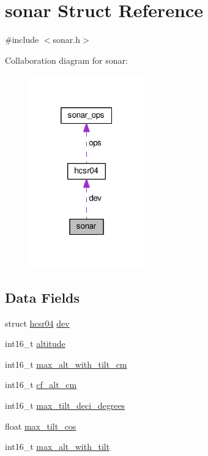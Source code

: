 \hypertarget{structsonar}{\section{sonar Struct Reference}
\label{structsonar}
}


{\ttfamily \#include $<$sonar.\+h$>$}



Collaboration diagram for sonar\+:\nopagebreak
\begin{figure}[H]
\begin{center}
\leavevmode
\includegraphics[width=140pt]{structsonar__coll__graph}
\end{center}
\end{figure}
\subsection*{Data Fields}
\begin{DoxyCompactItemize}
\item 
struct \hyperlink{structhcsr04}{hcsr04} \hyperlink{structsonar_af002b13bfccde4c53f025847accd9f64}{dev}
\item 
int16\+\_\+t \hyperlink{structsonar_a29b0ab60089b976e07964c161032fa67}{altitude}
\item 
int16\+\_\+t \hyperlink{structsonar_aa03ed590552a2e4eedc16458336a9713}{max\+\_\+alt\+\_\+with\+\_\+tilt\+\_\+cm}
\item 
int16\+\_\+t \hyperlink{structsonar_a9f565d5614b9288a7624544b95a05f1f}{cf\+\_\+alt\+\_\+cm}
\item 
int16\+\_\+t \hyperlink{structsonar_af0b72ab298a1e42840cfa419264c231e}{max\+\_\+tilt\+\_\+deci\+\_\+degrees}
\item 
float \hyperlink{structsonar_a0e959719395f4985f2a794412b3e4fd1}{max\+\_\+tilt\+\_\+cos}
\item 
int16\+\_\+t \hyperlink{structsonar_abdfba03b0fcd3a4e976e3fe298a08cbd}{max\+\_\+alt\+\_\+with\+\_\+tilt}
\end{DoxyCompactItemize}


